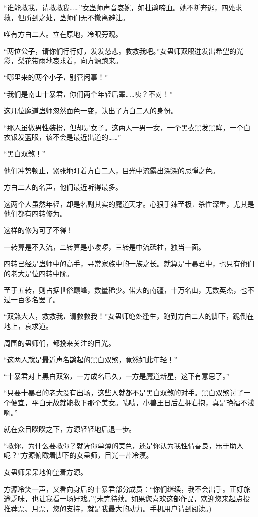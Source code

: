 \begin{this_body}
“谁能救我，请救救我……”女蛊师声音哀婉，如杜鹃啼血。她不断奔逃，四处求救，但所到之处，蛊师们无不撤离避让。

唯有方白二人。立在原地，冷眼旁观。

“两位公子，请你们行行好，发发慈悲。救救我吧。”女蛊师双眼迸发出希望的光彩，梨花带雨地哀求着，向方源跑来。

“哪里来的两个小子，别管闲事！”

“我们是南山十暴君，你们两个年轻后辈……咦？不对！”

这几位魔道蛊师忽然面色一变，认出了方白二人的身份。

“那人虽做男性装扮，但却是女子。这两人一男一女，一个黑衣黑发黑眸，一个白衣银发蓝眼，该不会是最近出道的……”

“黑白双煞！”

他们冲势顿止，紧张地盯着方白二人，目光中流露出深深的忌惮之色。

方白二人的名声，他们最近听得最多。

这两个人虽然年轻，却是名副其实的魔道天才。心狠手辣至极，杀性深重，尤其是他们都有四转修为。

这样的修为可了不得！

一转算是不入流，二转算是小喽啰，三转是中流砥柱，独当一面。

四转已经是蛊师中的高手，寻常家族中的一族之长。就算是十暴君中，也只有他们的老大是位四转中阶。

至于五转，则占据世俗巅峰，数量稀少。偌大的南疆，十万名山，无数英杰，也不过一百多名罢了。

“双煞大人，救救我，请救救我！”女蛊师绝处逢生，跑到方白二人的脚下，跪倒在地上，哀求道。

周围的蛊师们，都投来关注的目光。

“这两人就是最近声名鹊起的黑白双煞，竟然如此年轻！”

“十暴君对上黑白双煞，一方成名已久，一方是魔道新星，这下有意思了。”

“只要十暴君的老大没有出场，这些人就都不是黑白双煞的对手。黑白双煞讨了一个便宜，平白无故就能救下那个美女。啧啧，小兽王日后左拥右抱，真是艳福不浅啊。”

就在众目睽睽之下，方源轻轻地后退一步。

“救你，为什么要救你？就凭你单薄的美色，还是你认为我性情善良，乐于助人呢？”方源俯瞰着脚下的女蛊师，目光一片冷漠。

女蛊师呆呆地仰望着方源。

方源冷笑一声，又看向身后的十暴君部分成员：“你们继续，我不会出手。正好旅途乏味，也让我看一场好戏。”(未完待续。如果您喜欢这部作品，欢迎您来起点投推荐票、月票，您的支持，就是我最大的动力。手机用户请到阅读。)

\end{this_body}

